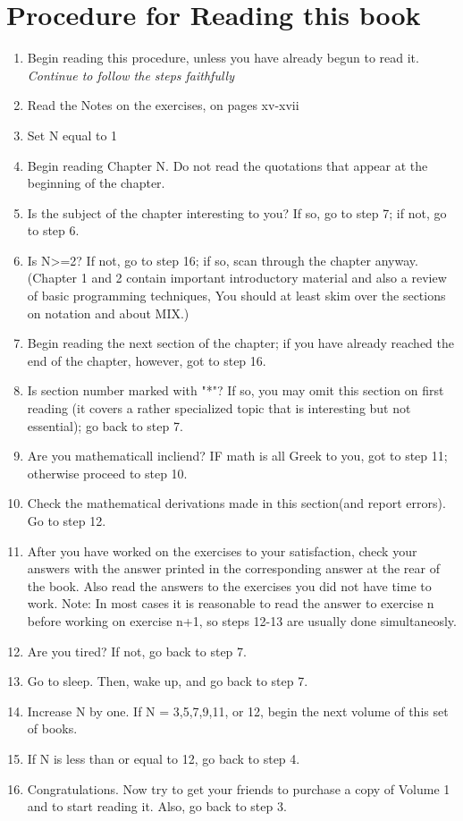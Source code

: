 \documentclass{article}
\begin{document}
\section{Procedure for Reading this book}
\begin{enumerate}
    \item Begin reading this procedure, unless you have already begun to read it. \textit{Continue to follow the steps faithfully}
    \item Read the Notes on the exercises, on pages xv-xvii
    \item Set N equal to 1
    \item Begin reading Chapter N. Do not read the quotations that appear at the beginning of the chapter.
    \item Is the subject of the chapter interesting to you? If so, go to step 7; if not, go to step 6.
    \item Is N>=2? If not, go to step 16; if so, scan through the chapter anyway. (Chapter 1 and 2 contain important introductory material and also a review of basic programming techniques, You should at least skim over the sections on notation and about MIX.)
    \item Begin reading the next section of the chapter; if you have already reached the end of the chapter, however, got to step 16.
    \item Is section number marked with "*"? If so, you may omit this section on first reading (it covers a rather specialized topic that is interesting but not essential); go back to step 7.
    \item Are you mathematicall incliend? IF math is all Greek to you, got to step 11; otherwise proceed to step 10.
    \item Check the mathematical derivations made in this section(and report errors). Go to step 12.
    \item After you have worked on the exercises to your satisfaction, check your answers with the answer printed in the corresponding answer at the rear of the book. Also read the answers to the exercises you did not have time to work. Note: In most cases it is reasonable to read the answer to exercise n before working on exercise n+1, so steps 12-13 are usually done simultaneosly.
    \item Are you tired? If not, go back to step 7.
    \item Go to sleep. Then, wake up, and go back to step 7.
    \item Increase N by one. If N = 3,5,7,9,11, or 12, begin the next volume of this set of books.
    \item If N is less than or equal to 12, go back to step 4.
    \item Congratulations. Now try to get your friends to purchase a copy of Volume 1 and to start reading it. Also, go back to step 3.
\end{enumerate}
\end{document}
